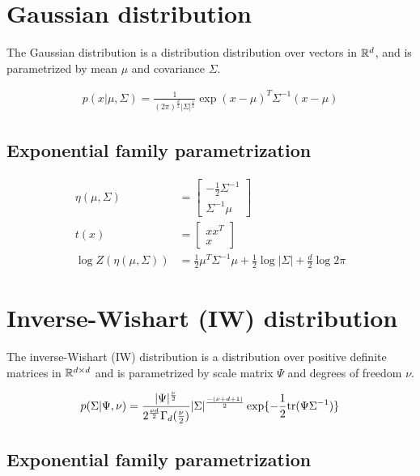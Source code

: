 \section{Gaussian distribution}
\label{sec:stats-gaussian}

The Gaussian distribution is a distribution
distribution over vectors in $\mathbb{R}^d$,
and is parametrized by mean $\mu$ and covariance $\Sigma$.

\begin{align}
        p(x | \mu, \Sigma) = \frac{1}{(2\pi)^{\frac{d}{2}}|\Sigma|^{\frac{1}{2}}} \exp{(x - \mu)^T\Sigma^{-1}(x - \mu)}
\end{align}

\subsection*{Exponential family parametrization}

\begin{align*}
    \eta(\mu, \Sigma) &= \begin{bmatrix}-\frac{1}{2}\Sigma^{-1} \\ \Sigma^{-1}\mu\end{bmatrix} \\
    t(x) &= \begin{bmatrix}xx^T \\ x\end{bmatrix} \\
    \log Z(\eta(\mu, \Sigma)) &= \frac{1}{2}\mu^T\Sigma^{-1}\mu + \frac{1}{2}\log |\Sigma| + \frac{d}{2}\log 2\pi
\end{align*}

\section{Inverse-Wishart (IW) distribution}
\label{sec:stats-iw}

The inverse-Wishart (IW) distribution is a
distribution over positive definite matrices in $\mathbb{R}^{d \times d}$
and is parametrized by scale matrix $\Psi$ and degrees of freedom $\nu$.

\begin{align}
        p(\Sigma | \Psi, \nu) = \frac{|\Psi|^{\frac{\nu}{2}}}{2^{\frac{\nu d}{2}}\Gamma_d(\frac{\nu}{2})}|\Sigma|^{\frac{-(\nu + d + 1)}{2}} \exp{-\frac{1}{2}\tr(\Psi\Sigma^{-1})}
\end{align}

\subsection*{Exponential family parametrization}

